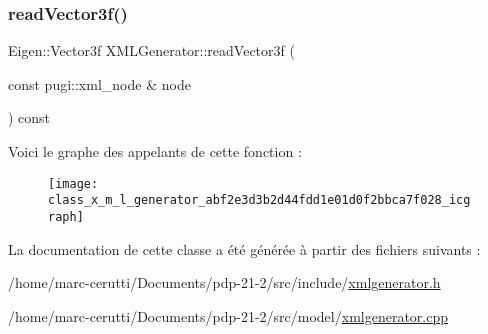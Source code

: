 \subsubsection{\texorpdfstring{read\+Vector3f()}{readVector3f()}}
{\footnotesize\ttfamily Eigen\+::\+Vector3f X\+M\+L\+Generator\+::read\+Vector3f (\begin{DoxyParamCaption}\item[{const pugi\+::xml\+\_\+node \&}]{node }\end{DoxyParamCaption}) const\hspace{0.3cm}{\ttfamily [private]}}

Voici le graphe des appelants de cette fonction \+:
\nopagebreak
\begin{figure}[H]
\begin{center}
\leavevmode
\texttt{[image: class\_x\_m\_l\_generator\_abf2e3d3b2d44fdd1e01d0f2bbca7f028\_icgraph]}
\end{center}
\end{figure}


La documentation de cette classe a été générée à partir des fichiers suivants \+:\begin{DoxyCompactItemize}
\item 
/home/marc-\/cerutti/\+Documents/pdp-\/21-\/2/src/include/\hyperlink{xmlgenerator_8h}{xmlgenerator.\+h}\item 
/home/marc-\/cerutti/\+Documents/pdp-\/21-\/2/src/model/\hyperlink{xmlgenerator_8cpp}{xmlgenerator.\+cpp}\end{DoxyCompactItemize}
